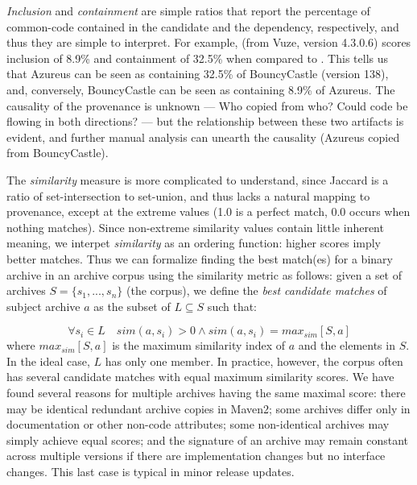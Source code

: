\emph{Inclusion} and \emph{containment} are simple ratios
that report the percentage of common-code contained in the
candidate and the dependency, respectively, and thus they
are simple to interpret.  For example,
 (from Vuze, version 4.3.0.6) scores
inclusion of 8.9\% and containment
of 32.5\% when compared to .
This tells us that Azureus can be seen as containing 32.5\%
of BouncyCastle (version 138), and, conversely, BouncyCastle
can be seen as containing 8.9\% of Azureus.  The causality of
the provenance is unknown --- Who copied from who?  Could
code be flowing in both directions? --- but the relationship
between these two artifacts is evident, and further manual
analysis can unearth the causality
(Azureus copied from BouncyCastle).

The \emph{similarity} measure is more complicated to
understand, since Jaccard is a ratio of set-intersection
to set-union, and  thus lacks a natural mapping to provenance,
except at the extreme values (1.0 is a perfect match,
0.0 occurs when nothing matches).
Since non-extreme similarity values contain little inherent
meaning, we interpet \emph{similarity} as an ordering function:  
higher scores imply better matches. 
Thus we can formalize finding the best match(es) for a binary
archive in an archive corpus using the similarity metric as
follows: given a set of archives $S = \{ s_1, ..., s_n\}$
(the corpus), we define the \emph{best candidate matches}
of subject archive $a$ as the subset of $L \subseteq S$ such that:

\[ \forall s_i \in L \quad sim(a,s_i) > 0 \wedge sim(a,s_i) = max_{sim}[S, a]  \]
where $max_{sim}[S, a]$ is the maximum similarity index of $a$ and the
elements in $S$.
In the ideal case, $L$ has only one member.  In practice,
however, the corpus often has several candidate matches with equal maximum
similarity scores.  We have found several reasons for multiple archives
having the same maximal score: there may be identical redundant archive
copies in Maven2; some archives differ only in documentation or other
non-code attributes; some non-identical archives may simply achieve equal
scores;
and the signature of an archive may
remain constant across multiple versions if there are implementation
changes but no interface changes.  This last case is typical in minor
release updates.

